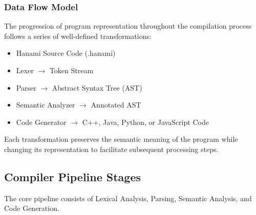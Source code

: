 \documentclass[conference]{IEEEtran}
\begin{document}
\subsubsection{Data Flow Model}

The progression of program representation throughout the compilation process follows a series of well-defined transformations:

\begin{itemize}
    \item Hanami Source Code (.hanami)
    \item Lexer $\rightarrow$ Token Stream
    \item Parser $\rightarrow$ Abstract Syntax Tree (AST)
    \item Semantic Analyzer $\rightarrow$ Annotated AST
    \item Code Generator $\rightarrow$ C++, Java, Python, or JavaScript Code %
\end{itemize}

Each transformation preserves the semantic meaning of the program while changing its representation to facilitate subsequent processing steps.

\subsection{Compiler Pipeline Stages}
\label{subsec:pipeline}

The core pipeline consists of Lexical Analysis, Parsing, Semantic Analysis, and Code Generation.
\end{document}
